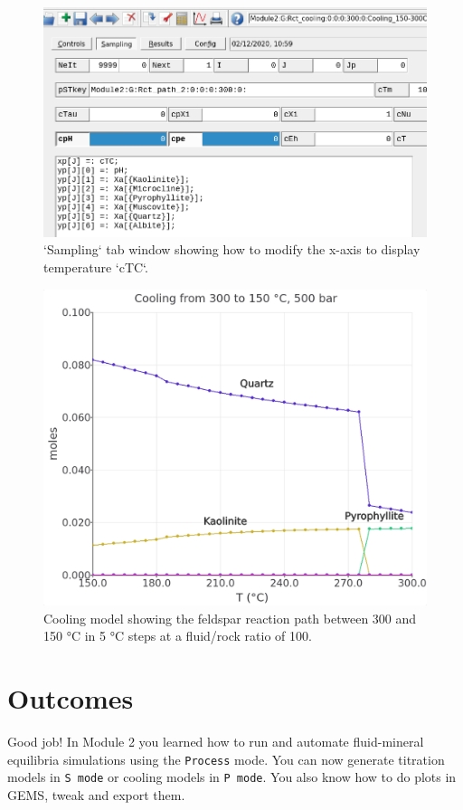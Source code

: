 \documentclass[
]{book}
\begin{document}
\begin{figure}
\includegraphics[width=0.8\linewidth]{figures/module2/fig-20} \caption{`Sampling` tab window showing how to modify the x-axis to display temperature `cTC`.}\label{fig:fig-20b}
\end{figure}

\begin{figure}
\includegraphics[width=0.8\linewidth]{figures/module2/fig-21} \caption{Cooling model showing the feldspar reaction path between 300 and 150 °C in 5 °C steps at a fluid/rock ratio of 100.}\label{fig:fig-21b}
\end{figure}

\hypertarget{outcomes-1}{%
\section{Outcomes}\label{outcomes-1}}

Good job! In Module 2 you learned how to run and automate fluid-mineral equilibria simulations using the \texttt{Process} mode. You can now generate titration models in \texttt{S\ mode} or cooling models in \texttt{P\ mode}. You also know how to do plots in GEMS, tweak and export them.
\end{document}
